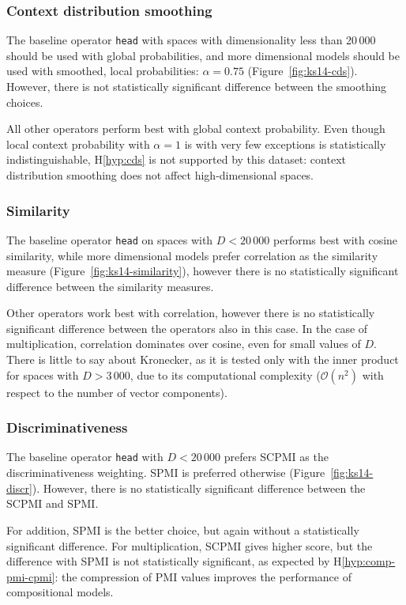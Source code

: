 \subsubsection{Context distribution smoothing}


The baseline operator \texttt{head} with spaces with dimensionality less than 20\,000 should be used with global probabilities, and more dimensional models should be used with smoothed, local probabilities: $\alpha = 0.75$ (Figure~\ref{fig:ks14-cds}). However, there is not statistically significant difference between the smoothing choices.

All other operators perform best with global context probability. Even though local context probability with $\alpha = 1$ is with very few exceptions is statistically indistinguishable, H\ref{hyp:cds} is not supported by this dataset: context distribution smoothing does not affect high-dimensional spaces.

\subsubsection{Similarity}
The baseline operator \texttt{head} on spaces with $D < 20\,000$ performs best with cosine similarity, while more dimensional models prefer correlation as the similarity measure (Figure~\ref{fig:ks14-similarity}), however there is no statistically significant difference between the similarity measures.

Other operators work best with correlation, however there is no statistically significant difference between the operators also in this case. In the case of multiplication, correlation dominates over cosine, even for small values of $D$. There is little to say about Kronecker, as it is tested only with the inner product for spaces with $D > 3\,000$, due to its computational complexity ($\mathcal{O}(n^2)$ with respect to the number of vector components).

\subsubsection{Discriminativeness}


The baseline operator \texttt{head} with $D < 20\,000$ prefers SCPMI as the discriminativeness weighting. SPMI is preferred otherwise (Figure~\ref{fig:ks14-discr}). However, there is no statistically significant difference between the SCPMI and SPMI.

For addition, SPMI is the better choice, but again without a statistically significant difference. For multiplication, SCPMI gives higher score, but the difference with SPMI is not statistically significant, as expected by H\ref{hyp:comp-pmi-cpmi}: the compression of PMI values improves the performance of compositional models.

